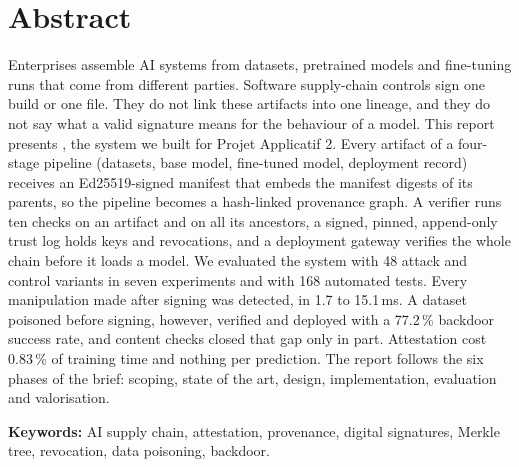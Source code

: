 \section*{Abstract}
\vspace{-0.45\baselineskip}{\color{cgrule}\rule{\textwidth}{0.6pt}}\par\vspace{0.15\baselineskip}
Enterprises assemble AI systems from datasets, pretrained models and fine-tuning runs that come from different
parties. Software supply-chain controls sign one build or one file. They do not link these artifacts into one
lineage, and they do not say what a valid signature means for the behaviour of a model. This report presents
\sys, the system we built for Projet Applicatif 2. Every artifact of a four-stage pipeline (datasets, base
model, fine-tuned model, deployment record) receives an Ed25519-signed manifest that embeds the manifest digests
of its parents, so the pipeline becomes a hash-linked provenance graph. A verifier runs ten checks on an artifact
and on all its ancestors, a signed, pinned, append-only trust log holds keys and revocations, and a deployment
gateway verifies the whole chain before it loads a model. We evaluated the system with 48 attack and control
variants in seven experiments and with 168 automated tests. Every manipulation made after signing was detected,
in 1.7 to 15.1\,ms. A dataset poisoned before signing, however, verified and deployed with a 77.2\,\% backdoor
success rate, and content checks closed that gap only in part. Attestation cost 0.83\,\% of training time and
nothing per prediction. The report follows the six phases of the brief: scoping, state of the art, design,
implementation, evaluation and valorisation.

{\sffamily\small\color{cgink2}\textbf{\color{cgnavy}Keywords:} AI supply chain, attestation, provenance, digital
signatures, Merkle tree, revocation, data poisoning, backdoor.}

